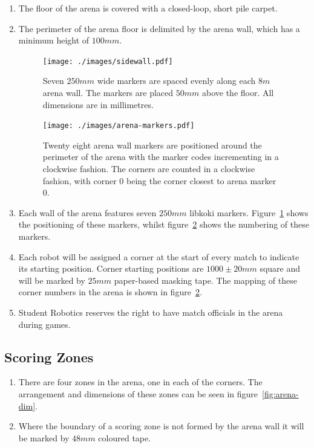 \begin{enumerate}
\item The floor of the arena is covered with a closed-loop, short pile carpet.

\item The perimeter of the arena floor is delimited by the arena wall, which has a minimum height of $100mm$.

\begin{figure}
  \centering
  \texttt{[image: ./images/sidewall.pdf]}
  \caption{Seven $250mm$ wide markers are spaced evenly along each $8m$ arena wall.
           The markers are placed $50mm$ above the floor.
           All dimensions are in millimetres.}
  \label{fig:arena-wall}
\end{figure}

\begin{figure}
  \centering
  \texttt{[image: ./images/arena-markers.pdf]}
  \caption{Twenty eight arena wall markers are positioned around the perimeter of the arena with the marker codes incrementing in a clockwise fashion.
           The corners are counted in a clockwise fashion, with corner 0 being the corner closest to arena marker 0.}
  \label{fig:arena-zones}
\end{figure}

\item Each wall of the arena features seven $250mm$ libkoki markers.
      Figure~\ref{fig:arena-wall} shows the positioning of these markers, whilst figure~\ref{fig:arena-zones} shows the numbering of these markers.

\item Each robot will be assigned a corner at the start of every match to indicate its starting position.
      Corner starting positions are $1000 \pm 20mm$ square and will be marked by $25mm$ paper-based masking tape.
      The mapping of these corner numbers in the arena is shown in figure~\ref{fig:arena-zones}.

\item Student Robotics reserves the right to have match officials in the arena during games.

\end{enumerate}


\subsection{Scoring Zones}
\label{sub:Zones}

\begin{enumerate}
\item There are four zones in the arena, one in each of the corners.
      The arrangement and dimensions of these zones can be seen in figure~\ref{fig:arena-dim}.

\item Where the boundary of a scoring zone is not formed by the arena wall it will be marked by $48mm$ coloured tape.
\end{enumerate}

